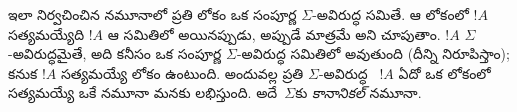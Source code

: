 \documentclass[../../../include/open-logic-section]{subfiles}
\begin{document}
ఇలా నిర్వచించిన నమూనాలో ప్రతి లోకం ఒక సంపూర్ణ
$\Sigma$-అవిరుద్ధ సమితే. ఆ లోకంలో $!A$ సత్యమయ్యేది
$!A$ ఆ సమితిలో  అయినప్పుడు, అప్పుడే మాత్రమే అని చూపుతాం. $!A$ $\Sigma$-అవిరుద్ధమైతే,
అది కనీసం ఒక సంపూర్ణ $\Sigma$-అవిరుద్ధ సమితిలో
 అవుతుంది (దీన్ని నిరూపిస్తాం);
కనుక $!A$ సత్యమయ్యే లోకం ఉంటుంది. అందువల్ల ప్రతి
$\Sigma$-అవిరుద్ధ ~$!A$
ఏదో ఒక లోకంలో సత్యమయ్యే ఒకే నమూనా మనకు లభిస్తుంది.
అదే~$\Sigma$కు \emph{కానానికల్} నమూనా.
\end{document}
